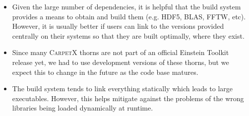 \documentclass[12pt,a4paper]{article}
\numberwithin{figure}{subsection}
\begin{document}
\begin{itemize}
    and speed up the whole process. For our tests, whilst iterating the
    configuration on Tursa, we ended up building many dependencies externally
    using Spack \cite{Gamblin:2015a} in order to speed up the process.
    \item Given the large number of dependencies, it is helpful that the build
    system provides a means to obtain and build them (e.g. HDF5, BLAS, FFTW, etc).
    However, it is usually better if users can link to the versions provided centrally
    on their systems so that they are built optimally, where they exist.
    \item Since many \textsc{CarpetX} thorns are not part of an official
    Einstein Toolkit release yet, we had to use development versions of these
    thorns, but we expect this to change in the future as the code base matures.
    \item The build system tends to link everything statically which leads to
    large executables. However, this helps mitigate against the problems of the wrong
    libraries being loaded dynamically at runtime.
\end{itemize}
\end{document}

